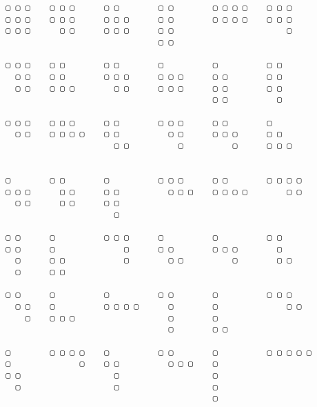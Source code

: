 {
\small
\begin{Verbatim}
 ▢ ▢ ▢    ▢ ▢ ▢      ▢ ▢        ▢ ▢        ▢ ▢ ▢ ▢    ▢ ▢ ▢
 ▢ ▢ ▢    ▢ ▢ ▢      ▢ ▢ ▢      ▢ ▢        ▢ ▢ ▢ ▢    ▢ ▢ ▢
 ▢ ▢ ▢      ▢ ▢      ▢ ▢ ▢      ▢ ▢                       ▢
                                ▢ ▢

 ▢ ▢ ▢    ▢ ▢        ▢ ▢        ▢          ▢          ▢ ▢
   ▢ ▢    ▢ ▢        ▢ ▢ ▢      ▢ ▢ ▢      ▢ ▢        ▢ ▢
   ▢ ▢    ▢ ▢ ▢        ▢ ▢      ▢ ▢ ▢      ▢ ▢        ▢ ▢
                                           ▢ ▢          ▢

 ▢ ▢ ▢    ▢ ▢ ▢      ▢ ▢        ▢ ▢ ▢      ▢ ▢        ▢
   ▢ ▢    ▢ ▢ ▢ ▢    ▢ ▢          ▢ ▢      ▢ ▢ ▢      ▢ ▢
                       ▢ ▢          ▢          ▢      ▢ ▢ ▢


 ▢        ▢ ▢        ▢          ▢ ▢ ▢      ▢ ▢        ▢ ▢ ▢ ▢
 ▢ ▢ ▢      ▢ ▢      ▢ ▢          ▢ ▢ ▢    ▢ ▢ ▢ ▢        ▢ ▢
   ▢ ▢      ▢ ▢      ▢ ▢
                       ▢

 ▢ ▢      ▢          ▢ ▢ ▢      ▢          ▢          ▢ ▢
 ▢ ▢      ▢              ▢      ▢ ▢        ▢ ▢ ▢        ▢
   ▢      ▢ ▢            ▢        ▢ ▢          ▢        ▢ ▢
   ▢      ▢ ▢

 ▢ ▢      ▢          ▢          ▢ ▢        ▢          ▢ ▢ ▢
   ▢ ▢    ▢          ▢ ▢ ▢ ▢      ▢        ▢              ▢ ▢
     ▢    ▢ ▢ ▢                   ▢        ▢
                                  ▢        ▢ ▢

 ▢        ▢ ▢ ▢ ▢    ▢          ▢ ▢        ▢          ▢ ▢ ▢ ▢ ▢
 ▢              ▢    ▢ ▢          ▢ ▢ ▢    ▢
 ▢ ▢                   ▢                   ▢
   ▢                   ▢                   ▢
                                           ▢

\end{Verbatim}
}


